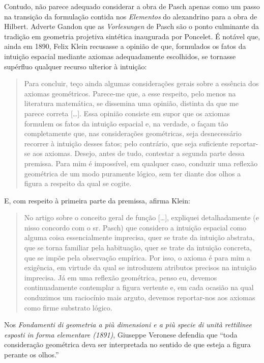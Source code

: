 \documentclass{hipatia}
\begin{document}
Contudo, não parece adequado considerar a obra de Pasch apenas como um passo na transição da formulação contida nos \emph{Elementos} do alexandrino para a obra de Hilbert. Adverte Gandon que as \emph{Vorlesungen} de Pasch são o ponto culminante da tradição em geometria projetiva sintética inaugurada por Poncelet.  \cite[p. 655--656]{gandon2005}                                                                                                             
É notável que, ainda em 1890, Felix Klein recusasse a opinião de que, formulados os fatos da intuição espacial mediante axiomas adequadamente escolhidos, se tornasse supérfluo qualquer recurso ulterior à intuição:
\begin{quote}
Para concluir, teço ainda algumas considerações gerais sobre a essência dos axiomas geométricos. Parece-me que, a esse respeito, pelo menos na literatura matemática, se dissemina uma opinião, distinta da que me parece correta [\dots]. Essa opinião consiste em supor que os axiomas formulem os fatos da intuição espacial e, na verdade, o façam tão completamente que, nas considerações geométricas, seja desnecessário recorrer à intuição desses fatos; pelo contrário, que seja suficiente reportar-se aos axiomas. Desejo, antes de tudo, contestar a segunda parte dessa premissa. Para mim é impossível, em qualquer caso, conduzir uma reflexão geométrica de um modo puramente lógico, sem ter diante dos olhos a figura a respeito da qual se cogite.  \cite[p. 380--381]{klein1890}
\end{quote}

E, com respeito à primeira parte da premissa, afirma Klein: 
\begin{quote}
No artigo sobre o conceito geral de função [\dots], expliquei detalhadamente (e nisso concordo com o sr. Pasch) que considero a intuição espacial como alguma coisa essencialmente imprecisa, quer se trate da intuição abstrata, que se torna familiar pela habituação, quer se trate da intuição concreta, que se impõe pela observação empírica. Por isso, o axioma é para mim a exigência, em virtude da qual se introduzem atributos precisos na intuição imprecisa. Já em uma reflexão geométrica, penso eu, devemos continuadamente contemplar a figura vertente e, em cada ocasião na qual conduzimos um raciocínio mais arguto, devemos reportar-nos aos axiomas como firme substrato lógico. \cite[p. 381]{klein1890}  
\end{quote}

Nos \emph{Fondamenti di geometria a più dimensioni e a più specie di unità rettilinee esposti in forma elementare (1891)}, Giuseppe Veronese defendia que ``toda consideração geométrica deva ser interpretada no sentido de que esteja a figura perante os olhos.'' \cite[\emph{apud}, p. 301]{bottazzini2001}  
\end{document}
